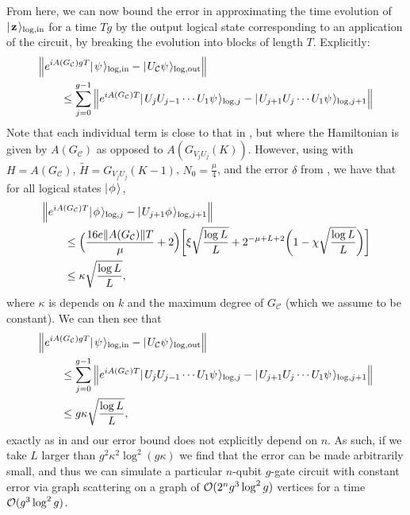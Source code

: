 \documentclass[../thesis-main/thesis-main]{subfiles}
\begin{document}
From here, we can now bound the error in approximating the time evolution of $|\mspace{2mu} \mathbf{z} \mspace{2mu} \rangle_{\text{log},\text{in}}$ for a time $Tg$ by the output logical state corresponding to an application of the circuit, by breaking the evolution into blocks of length $T$.  Explicitly:
\begin{align}
  &\Big \Vert e^{ i A(G_{\mathcal{C}} )g T} |\mspace{2mu} \psi \mspace{2mu} \rangle_{\text{log},\text{in}} - |\mspace{2mu} U_{\mathcal{C}} \psi \mspace{2mu} \rangle_{\text{log},\text{out}}\Big \Vert\nonumber\\
  & \qquad \leq \sum_{j = 0}^{g-1} \Big \Vert e^{ i A(G_{\mathcal{C}})T} |\mspace{2mu} U_{j} U_{j-1}\cdots U_1 \psi \mspace{2mu} \rangle_{\text{log},j} - |\mspace{2mu} U_{j+1}U_{j} \cdots U_1 \psi \mspace{2mu} \rangle_{\text{log},j+1}\Big \Vert
\end{align}
Note that each individual term is close to that in , but where the Hamiltonian is given by $A(G_{\mathcal{C}})$ as opposed to $A(G_{V_{j}U_{j}}(K))$.  However, using  with $H = A(G_{\mathcal{C}})$, $\tilde{H} = G_{V_jU_j}(K-1)$,  $N_0 = \frac{\mu}{4}$, and the error $\delta$ from , we have that for all logical states $|\mspace{2mu} \phi \mspace{2mu} \rangle$,
\begin{align}
   &\Big \Vert e^{ i A(G_{\mathcal{C}})T} |\mspace{2mu} \phi \mspace{2mu} \rangle_{\text{log},j} - |\mspace{2mu} U_{j+1}\phi \mspace{2mu} \rangle_{\text{log},j+1}\Big \Vert\nonumber\\
   &\qquad\leq \Big(\frac{ 16 e \|{A(G_{\mathcal{C}})}\| T}{\mu} + 2\Big)\bigg[ \xi \sqrt{\frac{\log L}{L}} + 2^{- \mu + L +2} \bigg(1 -   \chi \sqrt{\frac{\log L}{L}} \bigg)\bigg]\\
   & \qquad\leq \kappa \sqrt{\frac{\log L}{L}},
\end{align}
where $\kappa$ is depends on $k$ and the maximum degree of $G_{\mathcal{C}}$ (which we assume to be constant).  We can then see that
\begin{align}
  &\Big \Vert e^{ i A(G_{\mathcal{C}} )g T} |\mspace{2mu} \psi \mspace{2mu} \rangle_{\text{log},\text{in}} - |\mspace{2mu} U_{\mathcal{C}} \psi \mspace{2mu} \rangle_{\text{log},\text{out}}\Big \Vert\nonumber\\
  & \qquad \leq \sum_{j = 0}^{g-1} \Big \Vert e^{ i A(G_{\mathcal{C}})T} |\mspace{2mu} U_{j} U_{j-1}\cdots U_1 \psi \mspace{2mu} \rangle_{\text{log},j} - |\mspace{2mu} U_{j+1}U_{j} \cdots U_1 \psi \mspace{2mu} \rangle_{\text{log},j+1}\Big \Vert\\
  &\qquad \leq g\kappa \sqrt{\frac{\log L}{L}},
\end{align}
exactly as in  and our error bound does not explicitly depend on $n$.  As such, if we take $L$ larger than $g^2\kappa^2 \log^2 (g\kappa)$ we find that the error can be made arbitrarily small, and thus we can simulate a particular $n$-qubit $g$-gate circuit with constant error via graph scattering on a graph of $\mathcal{O}(2^n g^3 \log^2 g)$ vertices for a time $\mathcal{O}(g^3\log^2 g)$.
\end{document}
